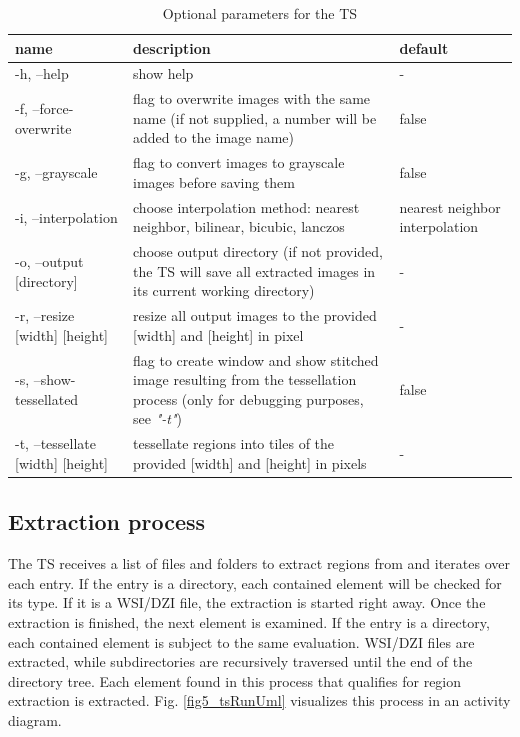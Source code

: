 \begin{table}[H]
	\begin{center}
		\begin{tabular}{| p{3cm} | p{5cm} | p{3cm} |}
			\hline
			\textbf{name} & \textbf{description} & \textbf{default}\\ \hline
			-h, --help & show help & - \\ \hline
			-f, --force-overwrite & flag to overwrite images with the same name (if not supplied, a number will be added to the image name) & false \\ \hline
			-g, --grayscale & flag to convert images to grayscale images before saving them & false \\ \hline
			-i, --interpolation & choose interpolation method: nearest neighbor, bilinear, bicubic, lanczos  & nearest neighbor interpolation \\ \hline
			-o, --output [directory] & choose output directory (if not provided, the TS will save all extracted images in its current working directory) & - \\ \hline
			-r, --resize [width] [height] & resize all output images to the provided [width] and [height] in pixel & - \\ \hline
			-s, --show-tessellated & flag to create window and show stitched image resulting from the tessellation process (only for debugging purposes, see \emph{"-t"}) & false\\ \hline
			-t, --tessellate [width] [height] & tessellate regions into tiles of the provided [width] and [height] in pixels & - \\ \hline
		\end{tabular}
		\caption{Optional parameters for the TS}
		\label{tab5_tsParams}
	\end{center}
\end{table}


\subsection{Extraction process}
\label{sec5_extractionProcess}
The TS receives a list of files and folders to extract regions from and iterates over each entry. If the entry is a directory, each contained element will be checked for its type. If it is a WSI/DZI file, the extraction is started right away. Once the extraction is finished, the next element is examined. If the entry is a directory, each contained element is subject to the same evaluation. WSI/DZI files are extracted, while subdirectories are recursively traversed until the end of the directory tree. Each element found in this process that qualifies for region extraction is extracted. Fig. \ref{fig5_tsRunUml} visualizes this process in an activity diagram.

